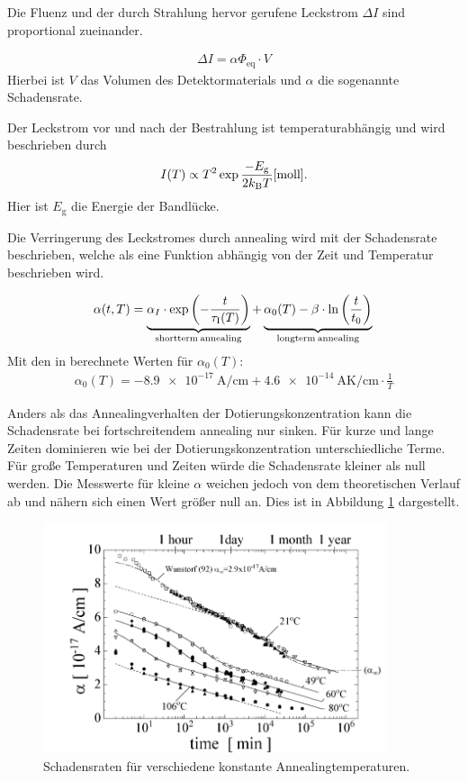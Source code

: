 Die Fluenz und der durch Strahlung hervor gerufene Leckstrom $\Delta I$ sind
proportional zueinander.


\begin{align}
  \Delta I = \alpha \Phi_{\mathrm{eq}} \cdot V
\end{align}
Hierbei ist $V$ das Volumen des Detektormaterials und $\alpha$ die
sogenannte Schadensrate.

Der Leckstrom vor und nach der Bestrahlung ist temperaturabhängig und wird
beschrieben durch
\begin{align}
  I(T) \propto T^2 \exp{\frac{-E_{\mathrm{g}}}{2 k_{\mathrm{B}}T}} \text{\cite{moll}} \label{eqn:Chilingarov_2013}.
\end{align}
Hier ist $E_{\mathrm{g}}$ die Energie der Bandlücke.

Die Verringerung des Leckstromes durch annealing wird mit der Schadensrate
beschrieben, welche als eine Funktion abhängig von der Zeit und
Temperatur beschrieben wird.\cite{moll}

\begin{align}
  \alpha(t, T) = \underbrace{\alpha_I \cdot \exp{\left(-\frac{t}{\tau_{\mathrm{I}}(T)}\right)}}_{\mathrm{shortterm \: annealing}} + \underbrace{\alpha_{\mathrm{0}}(T) -\beta \cdot \ln{\left(\frac{t}{t_{\mathrm{0}}}\right)}}_{\mathrm{longterm \: annealing}} \text{\label{eqn:damage}}
\end{align}
Mit den in \cite{moll} berechnete Werten für $\alpha_{\mathrm{0}}(T)$:
\begin{align}
  \alpha_{\mathrm{0}}(T) = \SI{-8.9e-17}{\ampere\per\centi\meter} + \SI{4.6e-14}{\ampere\kelvin\per\centi\meter} \cdot \frac{1}{T}
\end{align}

Anders als das Annealingverhalten der Dotierungskonzentration kann die Schadensrate
bei fortschreitendem annealing nur sinken. Für kurze und
lange Zeiten dominieren wie bei der Dotierungskonzentration unterschiedliche
Terme. Für große Temperaturen und Zeiten würde die Schadensrate kleiner als null
werden. Die Messwerte für kleine $\alpha$ weichen jedoch von dem
theoretischen Verlauf ab und nähern sich einen Wert größer null an. Dies
ist in Abbildung \ref{fig:damage_rates} dargestellt.

\begin{figure}
  \includegraphics[width=0.9\textwidth]{logos/schadensraten.PNG}
  \caption{Schadensraten für verschiedene konstante Annealingtemperaturen.\cite{moll}}
  \label{fig:damage_rates}
\end{figure}
